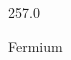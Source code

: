 \documentclass[12pt]{article}
\begin{document}
\hfill{}
\vfill
\begin{center}
  {\fontsize{50}{60}
  }

  \vspace{1em}

  257.0

Fermium
\end{center}
\vfill
\end{document}
